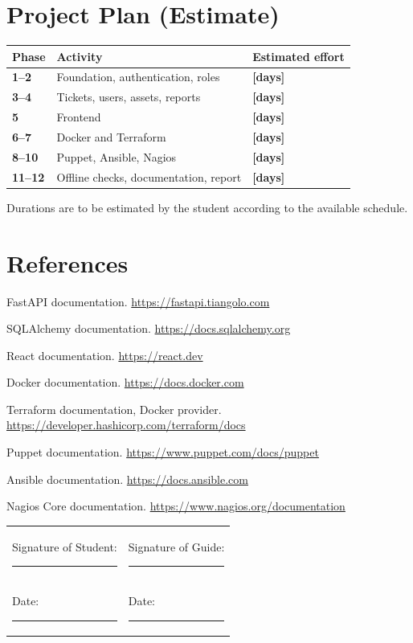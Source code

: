 \documentclass[12pt,a4paper]{article}
\newcommand{\fillin}[1]{\textbf{[#1]}}
\begin{document}
\section{Project Plan (Estimate)}
\begin{center}
\begin{tabular}{@{}>{\bfseries}p{1.3cm}p{9.5cm}p{3cm}@{}}
\toprule
Phase & Activity & Estimated effort\\
\midrule
1--2  & Foundation, authentication, roles & \fillin{days}\\
3--4  & Tickets, users, assets, reports & \fillin{days}\\
5     & Frontend & \fillin{days}\\
6--7  & Docker and Terraform & \fillin{days}\\
8--10 & Puppet, Ansible, Nagios & \fillin{days}\\
11--12& Offline checks, documentation, report & \fillin{days}\\
\bottomrule
\end{tabular}
\end{center}
Durations are to be estimated by the student according to the available schedule.

\section{References}
\begin{enumerate}[label={[\arabic*]},leftmargin=*]
  \item FastAPI documentation. \url{https://fastapi.tiangolo.com}
  \item SQLAlchemy documentation. \url{https://docs.sqlalchemy.org}
  \item React documentation. \url{https://react.dev}
  \item Docker documentation. \url{https://docs.docker.com}
  \item Terraform documentation, Docker provider. \url{https://developer.hashicorp.com/terraform/docs}
  \item Puppet documentation. \url{https://www.puppet.com/docs/puppet}
  \item Ansible documentation. \url{https://docs.ansible.com}
  \item Nagios Core documentation. \url{https://www.nagios.org/documentation}
\end{enumerate}

\vspace{1.2cm}
\begin{tabular}{@{}p{7cm}p{7cm}@{}}
Signature of Student: \rule{4cm}{0.4pt} & Signature of Guide: \rule{4cm}{0.4pt}\\[10pt]
Date: \rule{4cm}{0.4pt} & Date: \rule{4cm}{0.4pt}\\
\end{tabular}
\end{document}
